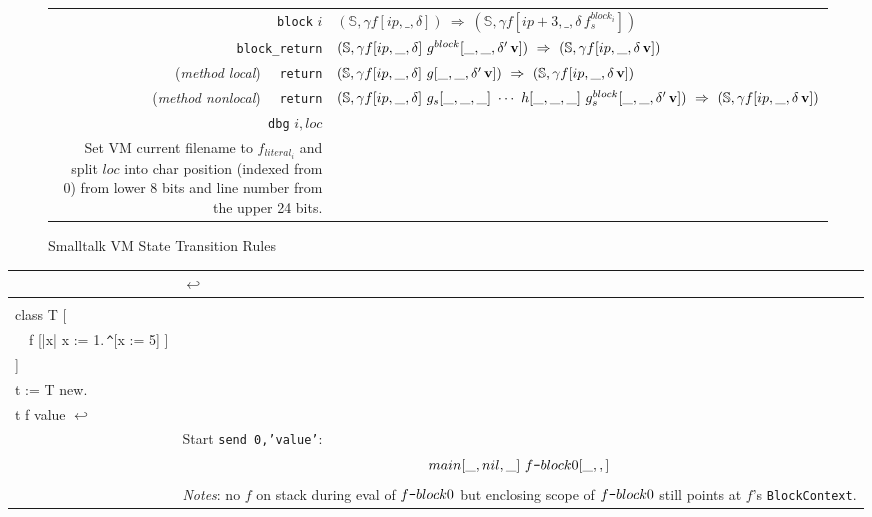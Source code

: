 \documentclass[11pt]{article}
\begin{document}
\begin{figure}
\begin{center}
\begin{tabular}[t]{r | l}
{\tt block} $i$  & $(\mathbb{S},\gamma f[ip,\_,\delta]) ~\Rightarrow~ (\mathbb{S},\gamma f[ip+3,\_,\delta \,f^{block_i}_s])$\\

{\tt block\_return} &  $(\mathbb{S},\gamma f[ip,\_,\delta]~g^{block}[\_,\_,\delta' \,{\bf v}]) ~\Rightarrow~ (\mathbb{S},\gamma f[ip,\_,\delta \,{\bf v}])$\\

({\em method local}) ~~{\tt return} & $(\mathbb{S},\gamma f[ip,\_,\delta] ~g[\_,\_,\delta' \,{\bf v}]) ~\Rightarrow~ (\mathbb{S},\gamma f[ip,\_,\delta \,{\bf v}])$\\

({\em method nonlocal}) ~~{\tt return} & $(\mathbb{S},\gamma f[ip,\_,\delta] ~g_s[\_,\_,\_]~ \cdots ~h[\_,\_,\_] ~ g^{block}_s[\_,\_,\delta' \,{\bf v}]) ~\Rightarrow~ (\mathbb{S},\gamma f[ip,\_,\delta \,{\bf v}])$\\

\hline

{\tt dbg} $i, loc$ &
\begin{minipage}[t]{.76\linewidth}
$(\mathbb{S},\gamma f[ip,\_,\_])\Rightarrow
 (\mathbb{S}[\text{\it file}\text{=}f_{literal_i}, \text{\it line}\text{=}loc[31\text{:}8], \text{\it col}\text{=}loc[7\text{:}0]],\gamma f[ip+7,\_,\_])$ \\
Set VM current filename to $f_{literal_i}$ and split $loc$ into char position (indexed from 0) from lower 8 bits and line number  from the upper 24 bits.
\end{minipage}\\
\end{tabular}
\end{center}
\vspace{-10pt}
\caption{Smalltalk VM State Transition Rules}
\label{default}
\end{figure}%


\begin{tabular}[t]{l | l}
\hspace{80pt}{\bf Smalltalk} & \hspace{80pt}{\bf Context stack at} {\color{red}$\hookleftarrow$} \\
\hline
\begin{minipage}[t]{0.4\linewidth}
{\tt\small
"Test testEvalReturnBlock"\\
class T [\\
\mbox{~~}f [|x| x := 1.\,\verb|^|[x := 5] ]\\
]\\
t := T new. \\
t f value {\color{red}$\hookleftarrow$}
}\\
\end{minipage} & 
\begin{minipage}[t]{0.5\linewidth}
Start {\tt send 0,'value'}:
\[
main[\_,nil,\_]~f\verb=-=block0[\_,,]
\]
{\em Notes}: no $f$ on stack during eval of $f\verb|-|block0$ but enclosing scope of $f\verb|-|block0$ still points at $f$'s {\tt BlockContext}.
\end{minipage} \\
\end{tabular}
\end{document}
